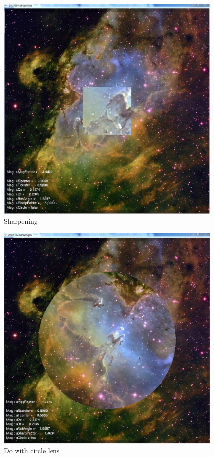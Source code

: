 \documentclass[12pt,letterpaper]{article}
\begin{document}
\begin{figure}[p]
    \centering
    \includegraphics[width=1.0\textwidth]{3.jpg}
    \caption{Sharpening}
\end{figure}

\begin{figure}[p]
    \centering
    \includegraphics[width=1.0\textwidth]{4.jpg}
    \caption{Do with circle lens}
\end{figure}
\end{document}
